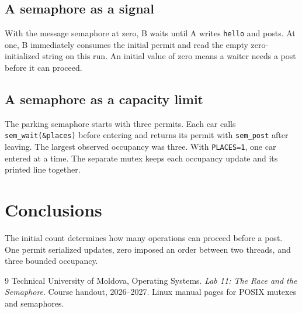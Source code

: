 \clearpage
\section{A semaphore as a signal}

With the message semaphore at zero, B waits until A writes \texttt{hello} and posts. At one, B immediately consumes the initial permit and read the empty zero-initialized string on this run. An initial value of zero means a waiter needs a post before it can proceed.


\clearpage
\section{A semaphore as a capacity limit}

The parking semaphore starts with three permits. Each car calls \texttt{sem\_wait(\&places)} before entering and returns its permit with \texttt{sem\_post} after leaving. The largest observed occupancy was three. With \texttt{PLACES=1}, one car entered at a time. The separate mutex keeps each occupancy update and its printed line together.


\chapter{Conclusions}

The initial count determines how many operations can proceed before a post. One permit serialized updates, zero imposed an order between two threads, and three bounded occupancy.

\begin{thebibliography}{9}
 Technical University of Moldova, Operating Systems. \emph{Lab 11: The Race and the Semaphore}. Course handout, 2026--2027.
 Linux manual pages for POSIX mutexes and semaphores.
\end{thebibliography}
